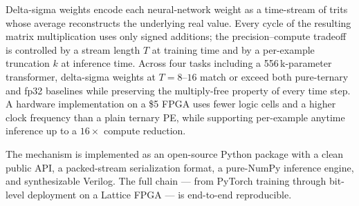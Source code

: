 \documentclass[11pt]{article}
\begin{document}
Delta-sigma weights encode each neural-network weight as a time-stream
of trits whose average reconstructs the underlying real value. Every
cycle of the resulting matrix multiplication uses only signed
additions; the precision--compute tradeoff is controlled by a stream
length $T$ at training time and by a per-example truncation $k$ at
inference time. Across four tasks including a 556\,k-parameter
transformer, delta-sigma weights at $T=8$--$16$ match or exceed both
pure-ternary and fp32 baselines while preserving the multiply-free
property of every time step. A hardware implementation on a
\$5 FPGA uses fewer logic cells and a higher clock frequency than a
plain ternary PE, while supporting per-example anytime inference up
to a $16\times$ compute reduction.

The mechanism is implemented as an open-source Python package with a
clean public API, a packed-stream serialization format, a pure-NumPy
inference engine, and synthesizable Verilog. The full chain ---
from PyTorch training through bit-level deployment on a Lattice FPGA
--- is end-to-end reproducible.



\end{document}
